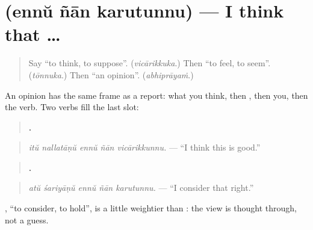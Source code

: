 \section[\texorpdfstring{\ml{എന്ന്} \ml{ഞാൻ} \ml{കരുതുന്നു} (ennŭ ñān karutunnu)}{എന്ന് ഞാൻ കരുതുന്നു (ennŭ ñān karutunnu)}]{   (ennŭ ñān karutunnu) — I think that …}

\label{lesson:ML-C341-ennu-karutunnu}



\begin{quote}
Say \textquotedblleft{}to think, to suppose\textquotedblright{}. (\emph{vicārikkuka}.) Then \textquotedblleft{}to feel, to seem\textquotedblright{}. (\emph{tōnnuka}.) Then \textquotedblleft{}an opinion\textquotedblright{}. (\emph{abhiprāyaṁ}.)
\end{quote}

\begin{grammarlens}[title={Grammar Lens: … \ml{എന്ന്} \ml{ഞാൻ} \ml{വിചാരിക്കുന്നു} / \ml{കരുതുന്നു}}]
An opinion has the same frame as a report: what you think, then \textbf{}, then you, then the verb. Two verbs fill the last slot:

\begin{quote}
\textbf{    .}
\end{quote}

\begin{quote}
\emph{itŭ nallatāṇŭ ennŭ ñān vicārikkunnu.} — \textquotedblleft{}I think this is good.\textquotedblright{}
\end{quote}

\begin{quote}
\textbf{    .}
\end{quote}

\begin{quote}
\emph{atŭ śariyāṇŭ ennŭ ñān karutunnu.} — \textquotedblleft{}I consider that right.\textquotedblright{}
\end{quote}

\textbf{}, \textquotedblleft{}to consider, to hold\textquotedblright{}, is a little weightier than \textbf{}: the view is thought through, not a guess.
\end{grammarlens}

